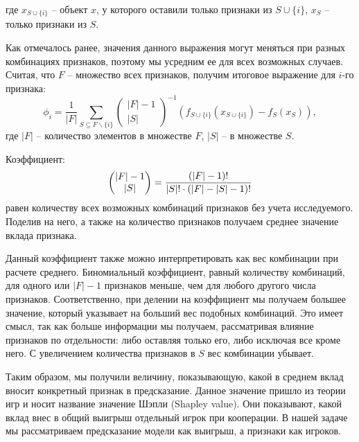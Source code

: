 где $x_{S \cup \{i\}}$ -- объект $x$, у которого оставили только признаки из $S \cup \{i\}$, $x_S$ -- только признаки из $S$.

Как отмечалось ранее, значения данного выражения могут меняться при разных комбинациях признаков, поэтому мы усредним ее для всех возможных случаев. Считая, что $F$ -- множество всех признаков, получим итоговое выражение для $i$-го признака:
\[
\phi_i = \frac{1}{|F|} \sum\limits_{S \subseteq F \backslash \{i\}}
\begin{pmatrix}
|F| - 1 \\
|S|
\end{pmatrix}^{-1}
(f_{S \cup \{i\}}(x_{S \cup \{i\}}) - f_S(x_S)),
\]
где $|F|$ -- количество элементов в множестве $F$, $|S|$ -- в множестве $S$.

Коэффициент:
\[
\displaystyle \begin{pmatrix}
|F| - 1 \\
|S|
\end{pmatrix} = \frac{(|F|-1)!}{|S|! \cdot (|F| - |S| - 1)!}
\]
равен количеству всех возможных комбинаций признаков без учета исследуемого. Поделив на него, а также на количество признаков получаем среднее значение вклада признака. %

Данный коэффициент также можно интерпретировать как вес комбинации при расчете среднего. Биномиальный коэффициент, равный количеству комбинаций, для одного или $|F|-1$ признаков меньше, чем для любого другого числа признаков. Соответственно, при делении на коэффициент мы получаем большее значение, который указывает на больший вес подобных комбинаций. Это имеет смысл, так как больше информации мы получаем, рассматривая влияние признаков по отдельности: либо оставляя только его, либо исключая все кроме него. С увеличением количества признаков в $S$ вес комбинации убывает.

Таким образом, мы получили величину, показывающую, какой в среднем вклад вносит конкретный признак в предсказание. Данное значение пришло из теории игр и носит название значение Шэпли (Shapley value). Они показывают, какой вклад внес в общий выигрыш отдельный игрок при кооперации. В нашей задаче мы рассматриваем предсказание модели как выигрыш, а признаки как игроков.